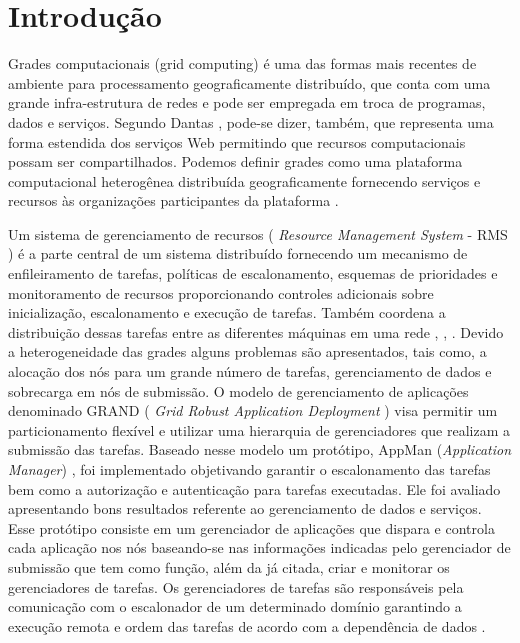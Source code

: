 \section{Introdução}
\label{cap:introducao}

Grades computacionais (grid computing) é uma das formas mais recentes de ambiente para processamento geograficamente distribuído, que conta com uma grande infra-estrutura de redes e pode ser empregada em troca de programas, dados e serviços. Segundo Dantas \cite{Dantas2005}, pode-se dizer, também, que representa uma forma estendida dos serviços Web permitindo que recursos computacionais possam ser compartilhados. Podemos definir grades como uma plataforma computacional heterogênea distribuída geograficamente fornecendo serviços e recursos às organizações participantes da plataforma \cite{Dantas2005}. 
       
Um sistema de gerenciamento de recursos ( \emph{Resource Management System} - RMS ) é a parte central de um sistema distribuído fornecendo um mecanismo de enfileiramento de tarefas, políticas de escalonamento, esquemas de prioridades e monitoramento de recursos proporcionando controles adicionais sobre inicialização, escalonamento e execução de tarefas. Também coordena a distribuição dessas tarefas entre as diferentes máquinas em uma rede \cite{condor2007}, \cite{Bayucan2007}, \cite{Mangan2006}. Devido a heterogeneidade das grades alguns problemas são apresentados, tais como, a alocação dos nós para um grande número de tarefas, gerenciamento de dados e sobrecarga em nós de submissão. O modelo de gerenciamento de aplicações denominado GRAND ( \emph{Grid Robust Application Deployment} ) \cite{Mangan2006} visa permitir um particionamento flexível e utilizar uma hierarquia de gerenciadores que realizam a submissão das tarefas. Baseado nesse modelo um protótipo, AppMan (\emph{Application Manager}) \cite{Vargas2003}, foi implementado objetivando garantir o escalonamento das tarefas bem como a autorização e autenticação para tarefas executadas. Ele foi avaliado apresentando bons resultados referente ao gerenciamento de dados e serviços. Esse protótipo consiste em um gerenciador de aplicações que dispara e controla cada aplicação nos nós baseando-se nas informações indicadas pelo gerenciador de submissão que tem como função, além da já citada, criar e monitorar os gerenciadores de tarefas. Os gerenciadores de tarefas são responsáveis pela comunicação com o escalonador de um determinado domínio garantindo a execução remota e ordem das tarefas de acordo com a dependência de dados \cite{Mangan2006}.

